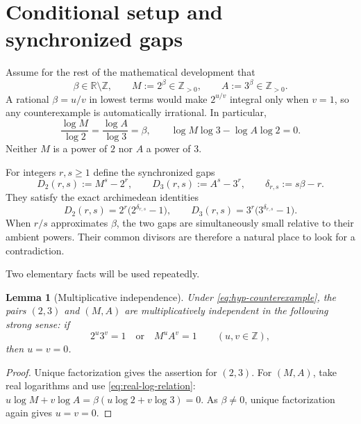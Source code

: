 \documentclass[11pt,oneside]{article}
\newtheorem{lemma}[theorem]{Lemma}
\theoremstyle{definition}
\newcommand{\Z}{\mathbb{Z}}
\newcommand{\R}{\mathbb{R}}
\begin{document}
\section{Conditional setup and synchronized gaps}\label{sec:setup}

Assume for the rest of the mathematical development that
\begin{equation}\label{eq:hyp-counterexample}
  \beta\in\R\setminus\Z,
  \qquad M:=2^\beta\in\Z_{>0},
  \qquad A:=3^\beta\in\Z_{>0}.
\end{equation}
A rational $\beta=u/v$ in lowest terms would make $2^{u/v}$ integral only
when $v=1$, so any counterexample is automatically irrational.  In
particular,
\begin{equation}\label{eq:real-log-relation}
  \frac{\log M}{\log 2}=\frac{\log A}{\log 3}=\beta,
  \qquad
  \log M\log 3-\log A\log 2=0.
\end{equation}
Neither $M$ is a power of $2$ nor $A$ a power of $3$.

For integers $r,s\ge1$ define the synchronized gaps
\begin{equation}\label{eq:gaps}
  D_2(r,s):=M^s-2^r,
  \qquad
  D_3(r,s):=A^s-3^r,
  \qquad
  \delta_{r,s}:=s\beta-r.
\end{equation}
They satisfy the exact archimedean identities
\begin{equation}\label{eq:gap-identities}
  D_2(r,s)=2^r\bigl(2^{\delta_{r,s}}-1\bigr),
  \qquad
  D_3(r,s)=3^r\bigl(3^{\delta_{r,s}}-1\bigr).
\end{equation}
When $r/s$ approximates $\beta$, the two gaps are simultaneously small
relative to their ambient powers.  Their common divisors are therefore a
natural place to look for a contradiction.

Two elementary facts will be used repeatedly.

\begin{lemma}[Multiplicative independence]\label{lem:independence}
Under \eqref{eq:hyp-counterexample}, the pairs $(2,3)$ and $(M,A)$ are
multiplicatively independent in the following strong sense: if
\[
  2^u3^v=1 \quad\text{or}\quad M^uA^v=1
  \qquad (u,v\in\Z),
\]
then $u=v=0$.
\end{lemma}

\begin{proof}
Unique factorization gives the assertion for $(2,3)$.  For $(M,A)$, take
real logarithms and use \eqref{eq:real-log-relation}:
$u\log M+v\log A=\beta(u\log2+v\log3)=0$.  As $\beta\ne0$, unique
factorization again gives $u=v=0$.
\end{proof}
\end{document}
